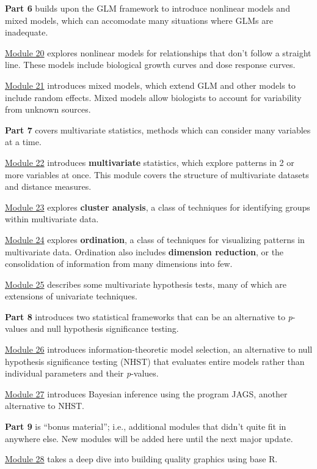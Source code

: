 \documentclass[
  13,
  letterpaper,
]{report}
\begin{document}
\textbf{Part 6} builds upon the GLM framework to introduce nonlinear
models and mixed models, which can accomodate many situations where GLMs
are inadequate.

\hyperref[sec-20]{Module 20} explores nonlinear models for relationships
that don't follow a straight line. These models include biological
growth curves and dose response curves.

\hyperref[sec-21]{Module 21} introduces mixed models, which extend GLM
and other models to include random effects. Mixed models allow
biologists to account for variability from unknown sources.

\textbf{Part 7} covers multivariate statistics, methods which can
consider many variables at a time.

\hyperref[sec-22]{Module 22} introduces \textbf{multivariate}
statistics, which explore patterns in 2 or more variables at once. This
module covers the structure of multivariate datasets and distance
measures.

\hyperref[sec-23]{Module 23} explores \textbf{cluster analysis}, a class
of techniques for identifying groups within multivariate data.

\hyperref[sec-24]{Module 24} explores \textbf{ordination}, a class of
techniques for visualizing patterns in multivariate data. Ordination
also includes \textbf{dimension reduction}, or the consolidation of
information from many dimensions into few.

\hyperref[sec-25]{Module 25} describes some multivariate hypothesis
tests, many of which are extensions of univariate techniques.

\textbf{Part 8} introduces two statistical frameworks that can be an
alternative to \emph{p}-values and null hypothesis significance testing.

\hyperref[sec-26]{Module 26} introduces information-theoretic model
selection, an alternative to null hypothesis significance testing (NHST)
that evaluates entire models rather than individual parameters and their
\emph{p}-values.

\hyperref[sec-27]{Module 27} introduces Bayesian inference using the
program JAGS, another alternative to NHST.

\textbf{Part 9} is ``bonus material''; i.e., additional modules that
didn't quite fit in anywhere else. New modules will be added here until
the next major update.

\hyperref[sec-28]{Module 28} takes a deep dive into building quality
graphics using base R.
\end{document}
